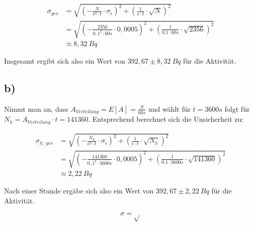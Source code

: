\documentclass{article}
\begin{document}
    \[
        \begin{aligned}
            \sigma_{ges} & = \sqrt{\left(  -\frac{N}{\epsilon^2 \cdot t} \cdot \sigma_\epsilon \right)^2 + \left( \frac{1}{\epsilon \cdot t} \cdot \sqrt{N} \right)^2} \\
            &= \sqrt{\left(  -\frac{2356}{0,1^2 \cdot 60s} \cdot 0,0005 \right)^2 + \left( \frac{1}{0.1 \cdot 60s} \cdot \sqrt{2356} \right)^2} \\
            & \approx 8,32 \ Bq
        \end{aligned}
    \]

    Insgesamt ergibt sich also ein Wert von \( 392,67\pm8,32 \ Bq \) für die Aktivität.

    \subsection*{b)}

    Nimmt man an, dass \( A_{Verteilung} = E[A] = \frac{N}{60s} \) und wählt für \( t = 3600s \) folgt für \( N_h = A_{Verteilung} \cdot t = 141360 \). Entsprechend berechnet sich die Unsicherheit zu:

    \[
        \begin{aligned}
            \sigma_{h;\ ges} & = \sqrt{\left(  -\frac{N_h}{\epsilon^2 \cdot t} \cdot \sigma_\epsilon \right)^2 + \left( \frac{1}{\epsilon \cdot t} \cdot \sqrt{N_h} \right)^2} \\
            &= \sqrt{\left(  -\frac{141360}{0,1^2 \cdot 3600s} \cdot 0,0005 \right)^2 + \left( \frac{1}{0.1 \cdot 3600s} \cdot \sqrt{141360} \right)^2} \\
            & \approx 2,22 \ Bq
        \end{aligned}
    \]

    Nach einer Stunde ergäbe sich also ein Wert von \( 392,67\pm2,22 \ Bq \) für die Aktivität.

    \[ \sigma = \sqrt{} \]
\end{document}

